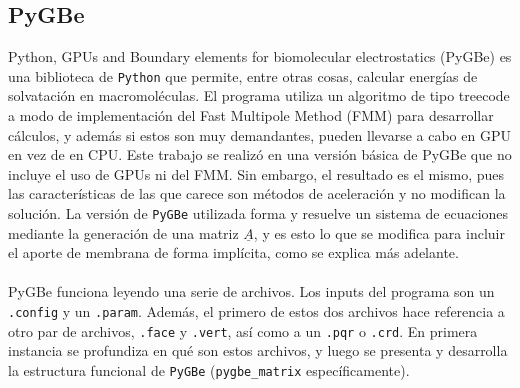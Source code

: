 \documentclass[12pt, twoside, onehalfspace, numbers, spanish]{ezthesis}
\numberwithin{equation}{section}
\begin{document}
\subsection{PyGBe}\label{subsec:PyGBe}
Python, GPUs and Boundary elements for biomolecular electrostatics (PyGBe) es una biblioteca de \texttt{Python} que permite, entre otras cosas, calcular energías de solvatación en macromoléculas. El programa utiliza un algoritmo de tipo treecode a modo de implementación del Fast Multipole Method (FMM) para desarrollar cálculos, y además si estos son muy demandantes, pueden llevarse a cabo en GPU en vez de en CPU. Este trabajo se realizó en una versión básica de PyGBe que no incluye el uso de GPUs ni del FMM. Sin embargo, el resultado es el mismo, pues las características de las que carece son métodos de aceleración y no modifican la solución. La versión de \texttt{PyGBe} utilizada forma y resuelve un sistema de ecuaciones mediante la generación de una matriz $\underline{A}$, y es esto lo que se modifica para incluir el aporte de membrana de forma implícita, como se explica más adelante.\\\\
PyGBe funciona leyendo una serie de archivos. Los inputs del programa son un \texttt{.config} y un \texttt{.param}. Además, el primero de estos dos archivos hace referencia a otro par de archivos, \texttt{.face} y \texttt{.vert}, así como a un \texttt{.pqr} o \texttt{.crd}. En primera instancia se profundiza en qué son estos archivos, y luego se presenta y desarrolla la estructura funcional de \texttt{PyGBe} (\texttt{pygbe\_matrix} específicamente).
\end{document}
